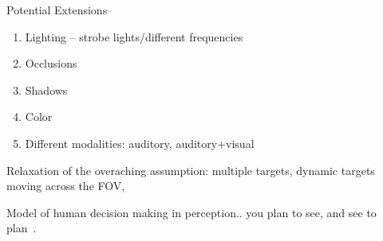 

Potential Extensions


\begin{enumerate}

\item Lighting – strobe lights/different frequencies
\item Occlusions
\item  Shadows
\item Color
\item Different modalities: auditory, auditory+visual

\end{enumerate}

Relaxation of the overaching assumption: multiple targets, dynamic targets moving across the FOV, 

Model of human decision making in perception.. you plan to see, and see to plan~\cite{}. 


